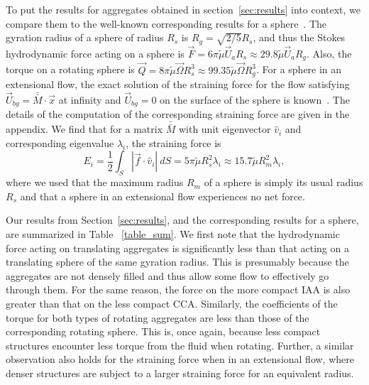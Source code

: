 To put the results for aggregates obtained in section~\ref{sec:results} into context, we compare them to the well-known corresponding results for a sphere~\cite{guazzelli_physical_2011}. 
The gyration radius of a sphere of radius $R_s$ is $R_g = \sqrt{2/5} R_s$, and thus the Stokes hydrodynamic force acting on a sphere is $\vec{F} = 6 \pi \tilde{\mu} \vec{U}_a R_s \approx 29.8 \tilde{\mu} \vec{U}_a R_g$.  Also, the torque on a rotating sphere is $\vec{Q} = 8 \pi \tilde{\mu} \vec{\Omega} R_s^3 \approx 99.35 \tilde{\mu} \vec{\Omega} R_g^3$. For a sphere in an extensional flow, the exact solution of the straining force for the flow satisfying $\vec{U}_{bg} = \bar{\bar{M}}\cdot \vec{x}$ at infinity and $\vec{U}_{bg} = 0$ on the surface of the sphere is known~\cite{guazzelli_physical_2011}. The details of the computation of the corresponding straining force are given in the appendix. We find that for a matrix $\bar{\bar{M}}$ with unit eigenvector $\hat{v}_i$ and corresponding eigenvalue $\lambda_i$, the straining force is
\[
E_{i}  = \frac{1}{2} \int_S | \vec{f} \cdot \hat{v}_i | \ dS = 5  \pi \tilde{\mu} R_s^2 \lambda_i \approx 15.7  \tilde{\mu} R_m^2  \lambda_i,
\] 
where we used that the maximum radius $R_m$ of a sphere is simply its usual radius $R_s$ and that a sphere in an extensional flow experiences no net force. 


Our results from Section~\ref{sec:results}, and the corresponding results for a sphere, are summarized in Table ~\ref{table_sum}. We first note that the hydrodynamic force acting on translating aggregates is significantly less than that acting on a translating sphere of the same gyration radius. This is presumably because the aggregates are not densely filled and thus allow some flow to effectively go through them. For the same reason, the force on the more compact IAA is also greater than that on the less compact CCA.
Similarly, the coefficients of the torque for both types of rotating aggregates are less than those of the corresponding rotating sphere. This is, once again, because less compact structures encounter less torque from the fluid when rotating. Further, a similar observation also holds for the straining force when in an extensional flow, where denser structures are subject to a larger straining force for an equivalent radius. 


